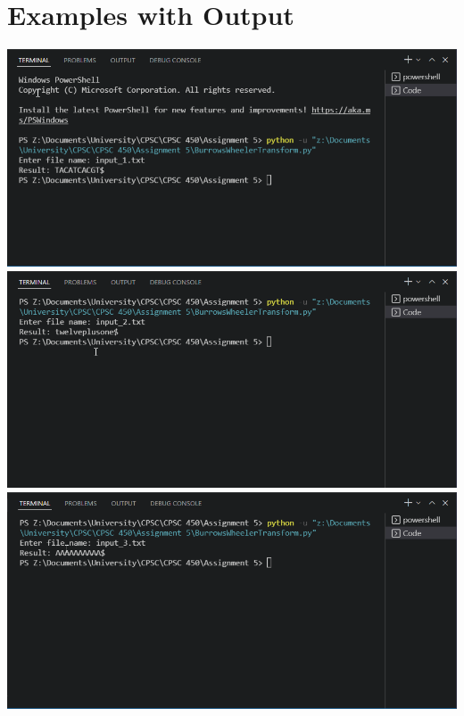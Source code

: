 \documentclass{article}
\begin{document}
\section*{Examples with Output}
\includegraphics[scale=0.55]{input_1.png}\\
\includegraphics[scale=0.55]{input_2.png}\\
\includegraphics[scale=0.55]{input_3.png}\\
\end{document}
